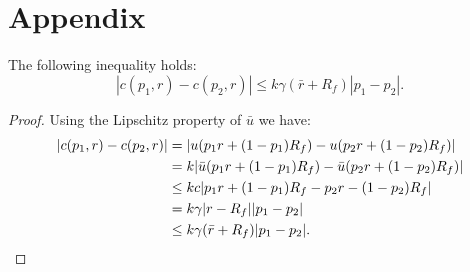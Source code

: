 \documentclass[11pt]{article}
\begin{document}
\section*{Appendix}
\begin{claim}
  \label{claim0}
  The following inequality holds:
  \begin{equation*}
    |c(p_1,r) - c(p_2,r)| \leq k\gamma(\bar r+R_f)|p_1-p_2|.
  \end{equation*}
\end{claim}
\begin{proof}
  Using the Lipschitz property of $\bar u$ we have:
  \begin{align*}
    |c(p_1,r) - c(p_2,r)| &= |u(p_1r + (1-p_1)R_f) - u(p_2r + (1-p_2)R_f)|\\
    &= k|\bar u(p_1 r + (1-p_1)R_f) - \bar u(p_2 r + (1-p_2)R_f)|\\
    &\leq k c |p_1 r + (1-p_1)R_f - p_2r - (1-p_2)R_f|\\
    &= k\gamma |r-R_f||p_1-p_2|\\
    &\leq k\gamma(\bar r+R_f)|p_1-p_2|.\qedhere
  \end{align*}
\end{proof}
\end{document}
